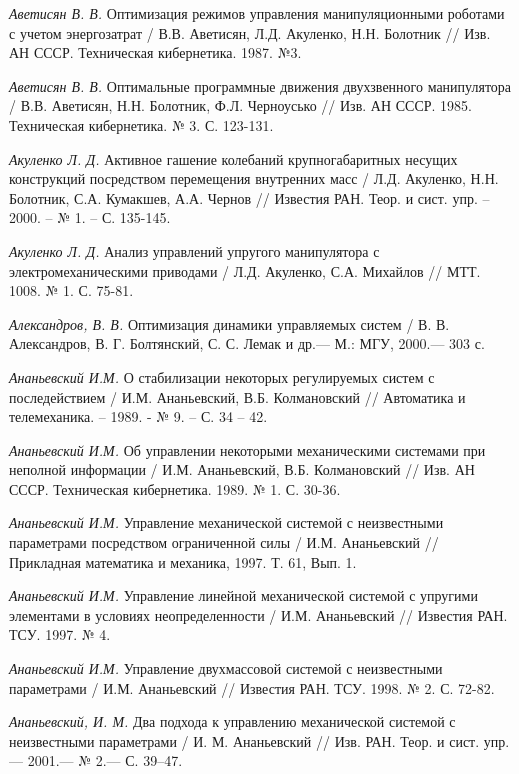 \begin{thebibliography}{10} \label{bibl}
	
	{\it Аветисян В. В.} Оптимизация режимов управления манипуляционными роботами с учетом энергозатрат / В.В. Аветисян, Л.Д. Акуленко, Н.Н. Болотник // Изв. АН СССР. Техническая кибернетика. 1987. №3.
	
	{\it Аветисян В. В.} Оптимальные программные движения двухзвенного манипулятора / В.В. Аветисян, Н.Н. Болотник, Ф.Л. Черноусько // Изв. АН СССР. 1985. Техническая кибернетика. № 3. С. 123-131.
	
	{\it Акуленко Л. Д.} Активное гашение колебаний крупногабаритных несущих конструкций посредством перемещения внутренних масс / Л.Д. Акуленко, Н.Н. Болотник, С.А. Кумакшев, А.А. Чернов // Известия РАН. Теор. и сист. упр. -- 2000. -- № 1. -- С. 135-145.
	
	{\it Акуленко Л. Д.} Анализ управлений упругого манипулятора с электромеханическими приводами / Л.Д. Акуленко, С.А. Михайлов // МТТ. 1008. № 1. С. 75-81.
	
	{\it Александров, В. В.} Оптимизация динамики управляемых систем / В. В. Александров, В. Г. Болтянский,
	С. С. Лемак и др.— М.: МГУ, 2000.— 303 с.
	
	{\it Ананьевский И.М.} О стабилизации некоторых регулируемых систем с последействием / И.М. Ананьевский, В.Б. Колмановский // Автоматика и телемеханика. – 1989. - № 9. – С. 34 – 42.
	
	{\it Ананьевский И.М.} Об управлении некоторыми механическими системами при неполной информации / И.М. Ананьевский, В.Б. Колмановский // Изв. АН СССР. Техническая кибернетика. 1989. № 1. С. 30-36.

	{\it Ананьевский И.М.} Управление механической системой с неизвестными параметрами посредством ограниченной силы / И.М. Ананьевский // Прикладная математика и механика, 1997. Т. 61, Вып. 1.
	
	{\it Ананьевский И.М.} Управление линейной механической системой с упругими элементами в условиях неопределенности / И.М. Ананьевский // Известия РАН. ТСУ. 1997. № 4.

	{\it Ананьевский И.М.} Управление двухмассовой системой с неизвестными параметрами / И.М. Ананьевский // Известия РАН. ТСУ. 1998. № 2. С. 72-82.

	{\it Ананьевский, И. М.} Два подхода к управлению механической системой с неизвестными параметрами /
	И. М. Ананьевский // Изв. РАН. Теор. и сист. упр.— 2001.— № 2.— С. 39–47.
	

\end{thebibliography}

